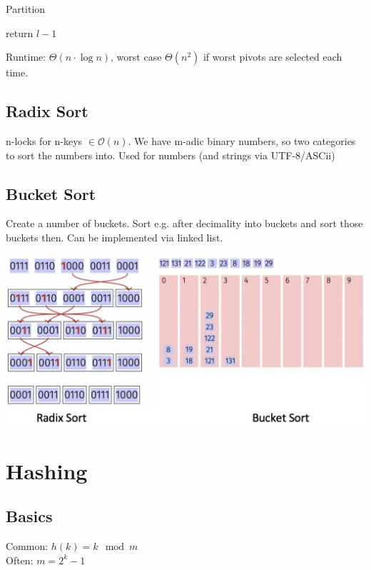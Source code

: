 \documentclass[9pt,landscape,a4paper, table]{extarticle}
\begin{document}
\begin{multicols*}{3}
{\scriptsize
\begin{algorithm}[H]
    \caption{Partition}
    
    \SetAlgoLined
    
    return $l-1$
\end{algorithm}}

Runtime: ${\Theta}(n\cdot \log n)$, worst case $\Theta(n^2)$ if worst pivots are selected each time.

\subsection{Radix Sort}
n-locks for n-keys $\in \mathcal{O}(n)$. We have m-adic binary numbers, so two categories to sort the numbers into. Used for numbers (and strings via UTF-8/ASCii)
\subsection{Bucket Sort}
Create a number of buckets. Sort e.g. after decimality into buckets and sort those buckets then. Can be implemented via linked list.


\begin{center}
    \hspace{1cm}\includegraphics[width = 0.6\linewidth]{img/Bucket.png}
\end{center}



\section{Hashing}

\subsection{Basics}
Common: $h(k) = k \mod m$\\
Often: $m = 2^k - 1$\\


\end{multicols*}
\end{document}
